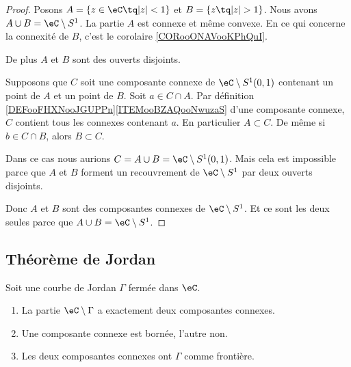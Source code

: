 \begin{proof}
	Posons \( A=\{ z\in \eC\tq | z |<1 \}\) et \( B=\{ z\tq| z |>1 \}\). Nous avons \( A\cup B=\eC\setminus S^1\). La partie \( A\) est connexe et même convexe. En ce qui concerne la connexité de \( B\), c'est le corolaire \ref{CORooONAVooKPhQuI}.

	De plus \( A\) et \( B\) sont des ouverts disjoints.

	Supposons que \( C\) soit une composante connexe de \( \eC\setminus S^1(0,1)\) contenant un point de \( A\) et un point de \( B\). Soit \( a\in C\cap A\). Par définition \ref{DEFooFHXNooJGUPPn}\ref{ITEMooBZAQooNwuzaS} d'une composante connexe, \( C\) contient tous les connexes contenant \( a\). En particulier \( A\subset C\). De même si \( b\in C\cap B\), alors \( B\subset C\).

	Dans ce cas nous aurions \( C=A\cup B=\eC\setminus S^1(0,1)\). Mais cela est impossible parce que \( A\) et \( B\) forment un recouvrement de \( \eC\setminus S^1\) par deux ouverts disjoints.

	Donc \( A\) et \( B\) sont des composantes connexes de \( \eC\setminus S^1\). Et ce sont les deux seules parce que \( A\cup B=\eC\setminus S^1\).
\end{proof}

\subsection{Théorème de Jordan}

\begin{theorem}\label{ThoHSPWBuh}
	Soit une courbe de Jordan \( \Gamma\) fermée dans \( \eC\).
	\begin{enumerate}
		\item		\label{ITEMooOAKXooMirWiD}
		      La partie \( \eC\setminus \Gamma\) a exactement deux composantes connexes.
		\item	\label{ITEMooICBGooXHMALK}
		      Une composante connexe est bornée, l'autre non.
		\item
		      Les deux composantes connexes ont \( \Gamma\) comme frontière.
	\end{enumerate}
\end{theorem}


